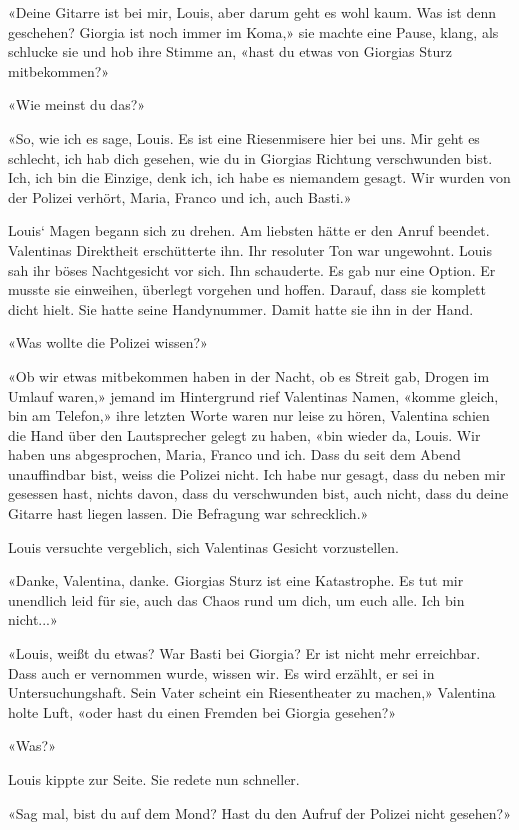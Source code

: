 «Deine Gitarre ist bei mir, Louis, aber darum geht es wohl kaum. Was ist
denn geschehen? Giorgia ist noch immer im Koma,» sie machte eine Pause,
klang, als schlucke sie und hob ihre Stimme an, «hast du etwas von
Giorgias Sturz mitbekommen?»

«Wie meinst du das?»

«So, wie ich es sage, Louis. Es ist eine Riesenmisere hier bei uns. Mir
geht es schlecht, ich hab dich gesehen, wie du in Giorgias Richtung
verschwunden bist. Ich, ich bin die Einzige, denk ich, ich habe es
niemandem gesagt. Wir wurden von der Polizei verhört, Maria, Franco und
ich, auch Basti.»

Louis` Magen begann sich zu drehen. Am liebsten hätte er den Anruf
beendet. Valentinas Direktheit erschütterte ihn. Ihr resoluter Ton war
ungewohnt. Louis sah ihr böses Nachtgesicht vor sich. Ihn schauderte. Es
gab nur eine Option. Er musste sie einweihen, überlegt vorgehen und
hoffen. Darauf, dass sie komplett dicht hielt. Sie hatte seine
Handynummer. Damit hatte sie ihn in der Hand.

«Was wollte die Polizei wissen?»

«Ob wir etwas mitbekommen haben in der Nacht, ob es Streit gab, Drogen
im Umlauf waren,» jemand im Hintergrund rief Valentinas Namen, «komme
gleich, bin am Telefon,» ihre letzten Worte waren nur leise zu hören,
Valentina schien die Hand über den Lautsprecher gelegt zu haben, «bin
wieder da, Louis. Wir haben uns abgesprochen, Maria, Franco und ich.
Dass du seit dem Abend unauffindbar bist, weiss die Polizei nicht. Ich
habe nur gesagt, dass du neben mir gesessen hast, nichts davon, dass du
verschwunden bist, auch nicht, dass du deine Gitarre hast liegen lassen.
Die Befragung war schrecklich.»

Louis versuchte vergeblich, sich Valentinas Gesicht vorzustellen.

«Danke, Valentina, danke. Giorgias Sturz ist eine Katastrophe. Es tut
mir unendlich leid für sie, auch das Chaos rund um dich, um euch alle.
Ich bin nicht...»

«Louis, weißt du etwas? War Basti bei Giorgia? Er ist nicht mehr
erreichbar. Dass auch er vernommen wurde, wissen wir. Es wird erzählt,
er sei in Untersuchungshaft. Sein Vater scheint ein Riesentheater zu
machen,» Valentina holte Luft, «oder hast du einen Fremden bei Giorgia
gesehen?»

«Was?»

Louis kippte zur Seite. Sie redete nun schneller.

«Sag mal, bist du auf dem Mond? Hast du den Aufruf der Polizei nicht
gesehen?»

